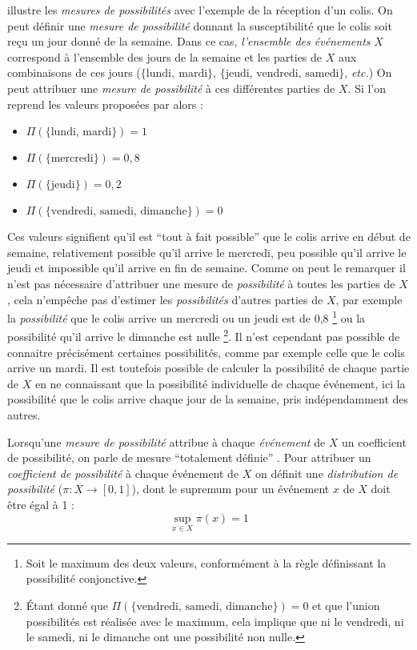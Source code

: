 \textcite{Bouchon-Meunier1995} illustre les \emph{mesures de
  possibilités} avec l'exemple de la réception d'un colis. On peut
définir une \emph{mesure de possibilité} donnant la susceptibilité que
le colis soit reçu un jour donné de la semaine. Dans ce cas,
\emph{l'ensemble des événements} \(X\) correspond à l'ensemble des
jours de la semaine et les parties de \(X\) aux combinaisons de ces
jours (\eg \(\{\text{lundi},\ \text{mardi}\}\),
\(\{\text{jeudi, vendredi, samedi}\}\), \emph{etc.})  On peut
attribuer une \emph{mesure de possibilité} à ces différentes parties
de \(X\). Si l'on reprend les valeurs proposées par
\textcite{Bouchon-Meunier1995} alors :
% 
\begin{itemize}
\item \(\Pi(\{\text{lundi, mardi}\})=1\)
\item \(\Pi(\{\text{mercredi}\})=0,8\)
\item \(\Pi(\{\text{jeudi}\})=0,2\)
\item \(\Pi(\{\text{vendredi, samedi, dimanche}\})=0\)
\end{itemize}
%
Ces valeurs signifient qu'il est \enquote{tout à fait possible} que le
colis arrive en début de semaine, relativement possible qu'il arrive
le mercredi, peu possible qu'il arrive le jeudi et impossible qu'il
arrive en fin de semaine. Comme on peut le remarquer il n'est pas
nécessaire d'attribuer une mesure de \emph{possibilité} à toutes les
parties de \(X\), cela n'empêche pas d'estimer les \emph{possibilités}
d'autres parties de \(X\), par exemple la \emph{possibilité} que le
colis arrive un mercredi ou un jeudi est de 0,8 \footnote{Soit le
  maximum des deux valeurs, conformément à la règle définissant la
  possibilité conjonctive.} ou la possibilité qu'il arrive le dimanche
est nulle \footnote{Étant donné que
  \(\Pi(\{\text{vendredi, samedi, dimanche}\})=0\) et que l'union
  possibilités est réalisée avec le maximum, cela implique que ni le
  vendredi, ni le samedi, ni le dimanche ont une possibilité non
  nulle.}. Il n'est cependant pas possible de connaitre précisément
certaines possibilités, comme par exemple celle que le colis arrive un
mardi. Il est toutefois possible de calculer la possibilité de chaque
partie de \(X\) en ne connaissant que la possibilité individuelle de
chaque événement, ici la possibilité que le colis arrive chaque jour
de la semaine, pris indépendamment des autres.

Lorsqu'une \emph{mesure de possibilité} attribue à chaque
\emph{événement} de \(X\) un coefficient de possibilité, on parle de
mesure \enquote{totalement définie}
\autocite{Bouchon-Meunier2007}. Pour attribuer un \emph{coefficient de
  possibilité} à chaque événement de \(X\) on définit une
\emph{distribution de possibilité} (\(π : X → [0,1]\)), dont le
supremum pour un événement \(x\) de \(X\) doit être égal à 1 :
%
\begin{equation}
  \sup_{x ∈ X}π(x)=1
\end{equation}

